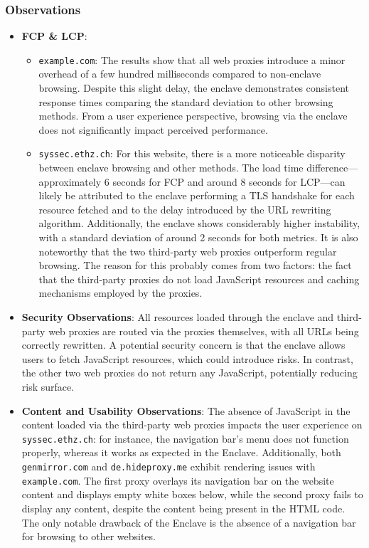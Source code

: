 \subsubsection{Observations}
\begin{itemize}
    \item \textbf{FCP \& LCP}:
    \begin{itemize}
        \item \texttt{example.com}: The results show that all web proxies introduce a minor overhead of a few hundred milliseconds compared to non-enclave browsing. Despite this slight delay, the enclave demonstrates consistent response times comparing the standard deviation to other browsing methods. From a user experience perspective, browsing via the enclave does not significantly impact perceived performance.
        \item \texttt{syssec.ethz.ch}: For this website, there is a more noticeable disparity between enclave browsing and other methods. The load time difference—approximately 6 seconds for FCP and around 8 seconds for LCP—can likely be attributed to the enclave performing a TLS handshake for each resource fetched and to the delay introduced by the URL rewriting algorithm. Additionally, the enclave shows considerably higher instability, with a standard deviation of around 2 seconds for both metrics. It is also noteworthy that the two third-party web proxies outperform regular browsing. The reason for this probably comes from two factors: the fact that the third-party proxies do not load JavaScript resources and caching mechanisms employed by the proxies.
    \end{itemize}
    \item \textbf{Security Observations}: All resources loaded through the enclave and third-party web proxies are routed via the proxies themselves, with all URLs being correctly rewritten. A potential security concern is that the enclave allows users to fetch JavaScript resources, which could introduce risks. In contrast, the other two web proxies do not return any JavaScript, potentially reducing risk surface.
    \item \textbf{Content and Usability Observations}: The absence of JavaScript in the content loaded via the third-party web proxies impacts the user experience on \texttt{syssec.ethz.ch}: for instance, the navigation bar's menu does not function properly, whereas it works as expected in the Enclave. Additionally, both \texttt{genmirror.com} and \texttt{de.hideproxy.me} exhibit rendering issues with \texttt{example.com}. The first proxy overlays its navigation bar on the website content and displays empty white boxes below, while the second proxy fails to display any content, despite the content being present in the HTML code. The only notable drawback of the Enclave is the absence of a navigation bar for browsing to other websites.
\end{itemize}

